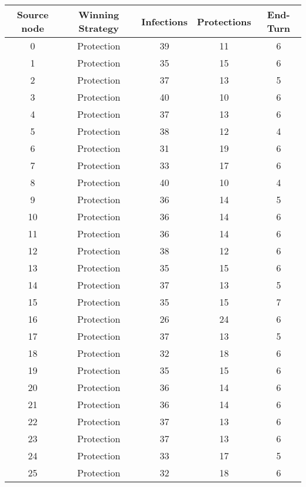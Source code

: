 \documentclass[results.tex]{subfiles}
\begin{document}
\begin{center}
  \begin{tabular}{| c || c | c | c | c |}
    \hline
    {\bfseries Source node} & {\bfseries Winning Strategy} & {\bfseries Infections} & {\bfseries Protections} & {\bfseries End-Turn} \\  %
    \hline\hline
    0 & Protection & 39 & 11 & 6 \\ 
    \hline
    1 & Protection & 35 & 15 & 6 \\ 
    \hline
    2 & Protection & 37 & 13 & 5 \\ 
    \hline
    3 & Protection & 40 & 10 & 6 \\ 
    \hline
    4 & Protection & 37 & 13 & 6 \\ 
    \hline
    5 & Protection & 38 & 12 & 4 \\ 
    \hline
    6 & Protection & 31 & 19 & 6 \\ 
    \hline
    7 & Protection & 33 & 17 & 6 \\ 
    \hline
    8 & Protection & 40 & 10 & 4 \\ 
    \hline
    9 & Protection & 36 & 14 & 5 \\ 
    \hline
    10 & Protection & 36 & 14 & 6 \\ 
    \hline
    11 & Protection & 36 & 14 & 6 \\ 
    \hline
    12 & Protection & 38 & 12 & 6 \\ 
    \hline
    13 & Protection & 35 & 15 & 6 \\ 
    \hline
    14 & Protection & 37 & 13 & 5 \\ 
    \hline
    15 & Protection & 35 & 15 & 7 \\ 
    \hline
    16 & Protection & 26 & 24 & 6 \\ 
    \hline
    17 & Protection & 37 & 13 & 5 \\ 
    \hline
    18 & Protection & 32 & 18 & 6 \\ 
    \hline
    19 & Protection & 35 & 15 & 6 \\ 
    \hline
    20 & Protection & 36 & 14 & 6 \\ 
    \hline
    21 & Protection & 36 & 14 & 6 \\ 
    \hline
    22 & Protection & 37 & 13 & 6 \\ 
    \hline
    23 & Protection & 37 & 13 & 6 \\ 
    \hline
    24 & Protection & 33 & 17 & 5 \\ 
    \hline
    25 & Protection & 32 & 18 & 6 \\ 

\end{tabular}
\end{center}
\end{document}
